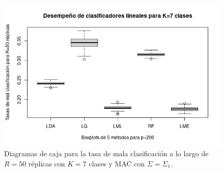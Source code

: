 \documentclass{report}
\begin{document}
\begin{figure} [h]
\begin{multicols}{2}
  		\caption*{$p=100$}
  		\includegraphics[width=\linewidth]{7_clases_p200_sigma_II}\par 
  		\caption*{$p=200$}
  		
  	\end{multicols}
  	\caption{ Diagramas de caja para la tasa de mala clasificación  a lo largo de $R=50$ réplicas con $K=7$ clases y MAC con $\Sigma=\Sigma_1$. }
  	\label{boxk7alta}
  \end{figure}
  
  




 


\end{document}
